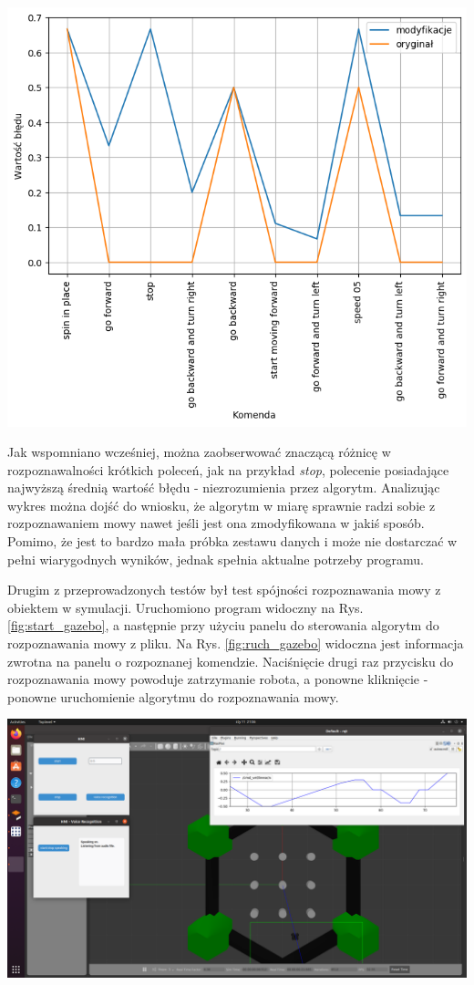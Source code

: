 \begin{center}
    \includegraphics[width=0.9\linewidth]{files/output5.png}
    \label{fig:dts4}
\end{center}

Jak wspomniano wcześniej, można zaobserwować znaczącą różnicę w rozpoznawalności krótkich poleceń, jak na przykład \textit{stop}, polecenie posiadające najwyższą średnią wartość błędu - niezrozumienia przez algorytm. Analizując wykres można dojść do wniosku, że algorytm w miarę sprawnie radzi sobie z rozpoznawaniem mowy nawet jeśli jest ona zmodyfikowana w jakiś sposób. Pomimo, że jest to bardzo mała próbka zestawu danych i może nie dostarczać w pełni wiarygodnych wyników, jednak spełnia aktualne potrzeby programu.

Drugim z przeprowadzonych testów był test spójności rozpoznawania mowy z obiektem w symulacji. Uruchomiono program widoczny na Rys.  \ref{fig:start_gazebo}, a następnie przy użyciu panelu do sterowania algorytm do rozpoznawania mowy z pliku. Na Rys. \ref{fig:ruch_gazebo} widoczna jest informacja zwrotna na panelu o rozpoznanej komendzie. Naciśnięcie drugi raz przycisku do rozpoznawania mowy powoduje zatrzymanie robota, a ponowne kliknięcie - ponowne uruchomienie algorytmu do rozpoznawania mowy.
\begin{center}
    \includegraphics[width=1\linewidth]{files/start.png}
    \label{fig:start_gazebo}
\end{center}


